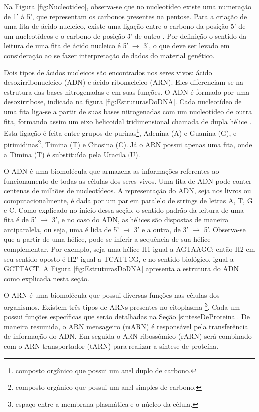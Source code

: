 \indent Na Figura \ref{fig:Nucleotideo}, observa-se que no nucleotídeo existe uma numeração de 1' à 5', que representam os carbonos presentes na pentose. Para a criação de uma fita de ácido nucleico, existe uma ligação entre o carbono da posição 5' de um nucleotídeos e o carbono de posição 3' de outro \cite{setubal97}. Por definição o sentido da leitura de uma fita de ácido nucleico é 5' $\rightarrow$ 3', o que deve ser levado em consideração ao se fazer interpretação de dados do material genético.

\indent Dois tipos de ácidos nucleicos são encontrados nos seres vivos: ácido desoxirribonucleico (ADN) e ácido ribonucleico (ARN). Eles diferenciam-se na estrutura das bases nitrogenadas e em suas funções. O ADN é formado por uma desoxirribose, indicada na figura \ref{fig:EstruturasDoDNA}. Cada nucleotídeo de uma fita liga-se a partir de suas bases nitrogenadas com um nucleotídeo de outra fita, formando assim um eixo helicoidal tridimensional chamada de dupla hélice \cite{setubal97}. Esta ligação é feita entre grupos de purinas\footnote{composto orgânico que possui um anel duplo de carbono.}, Adenina (A) e Guanina (G), e pirimidinas\footnote{composto orgânico que possui um anel simples de carbono.}, Timina (T) e Citosina (C). Já o ARN possui apenas uma fita, onde a Timina (T) é substituída pela Uracila (U).

\indent O ADN é uma biomolécula que armazena as informações referentes ao funcionamento de todas as células dos seres vivos. Uma fita de ADN pode conter centenas de milhões de nucleotídeos. A representação do ADN, seja nos livros ou computacionalmente, é dada por um par em paralelo de strings de letras A, T, G e C. Como explicado no início dessa seção, o sentido padrão da leitura de uma fita é de 5' $\rightarrow$ 3', e no caso do ADN, as hélices são dispostas de maneira antiparalela, ou seja, uma é lida de 5' $\rightarrow$ 3' e a outra, de 3' $\rightarrow$ 5'. Observa-se que a partir de uma hélice, pode-se inferir a sequência de sua hélice complementar. Por exemplo, seja uma hélice H1 igual a AGTAAGC; então H2 em seu sentido oposto é H2' igual a TCATTCG, e no sentido biológico, igual a GCTTACT. A Figura \ref{fig:EstruturasDoDNA} apresenta a estrutura do ADN como explicada nesta seção.

\indent O ARN é uma biomolécula que possui diversas funções nas células dos organismos. Existem três tipos de ARNs presentes no citoplasma \footnote{espaço entre a membrana plasmática e o núcleo da célula.}. Cada um possui funções específicas que serão detalhadas na Seção \ref{sinteseDeProteina}. De maneira resumida, o ARN mensageiro (mARN) é responsável pela transferência de informação do ADN. Em seguida o ARN ribossômico (rARN) será combinado com o ARN transportador (tARN) para realizar a síntese de proteína.

